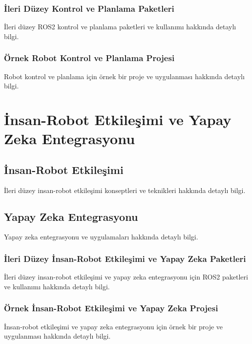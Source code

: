 \subsubsection{İleri Düzey Kontrol ve Planlama Paketleri}
İleri düzey ROS2 kontrol ve planlama paketleri ve kullanımı hakkında detaylı bilgi.

\subsubsection{Örnek Robot Kontrol ve Planlama Projesi}
Robot kontrol ve planlama için örnek bir proje ve uygulanması hakkında detaylı bilgi.

\section{İnsan-Robot Etkileşimi ve Yapay Zeka Entegrasyonu}
\subsection{İnsan-Robot Etkileşimi}
İleri düzey insan-robot etkileşimi konseptleri ve teknikleri hakkında detaylı bilgi.

\subsection{Yapay Zeka Entegrasyonu}
Yapay zeka entegrasyonu ve uygulamaları hakkında detaylı bilgi.

\subsubsection{İleri Düzey İnsan-Robot Etkileşimi ve Yapay Zeka Paketleri}
İleri düzey insan-robot etkileşimi ve yapay zeka entegrasyonu için ROS2 paketleri ve kullanımı hakkında detaylı bilgi.

\subsubsection{Örnek İnsan-Robot Etkileşimi ve Yapay Zeka Projesi}
İnsan-robot etkileşimi ve yapay zeka entegrasyonu için örnek bir proje ve uygulanması hakkında detaylı bilgi.
